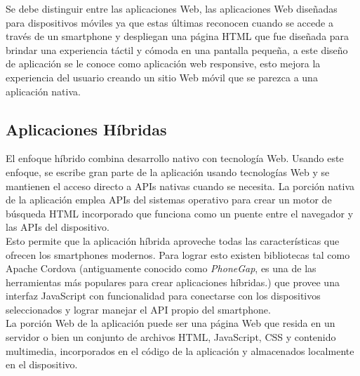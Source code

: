   Se debe distinguir entre las aplicaciones Web, las aplicaciones Web diseñadas para dispositivos móviles ya que estas últimas reconocen cuando se accede a través de un smartphone y despliegan una página HTML que fue diseñada para brindar una experiencia táctil y cómoda en una pantalla pequeña, a este diseño de aplicación se le conoce como aplicación web responsive, esto mejora la experiencia del usuario creando un sitio Web móvil que se parezca a una aplicación nativa.\\


  \subsection{Aplicaciones Híbridas}
  \label{sec:aplicaciones_hibridas}

    El enfoque híbrido combina desarrollo nativo con tecnología Web. Usando este enfoque, se escribe gran parte de la aplicación usando tecnologías Web y se mantienen el acceso directo a APIs nativas cuando se necesita. La porción nativa de la aplicación emplea APIs del sistemas operativo para crear un motor de búsqueda HTML incorporado que funciona como un puente entre el navegador y las APIs del dispositivo\cite{IBM_Mobile}.\\

    Esto permite que la aplicación híbrida aproveche todas las características que ofrecen los smartphones modernos. Para lograr esto existen bibliotecas tal como Apache Cordova (antiguamente conocido como \emph{PhoneGap}, es una de las herramientas más populares para crear aplicaciones híbridas.) que provee una interfaz JavaScript con funcionalidad para conectarse con los dispositivos seleccionados y lograr manejar el API propio del smartphone.\\

    La porción Web de la aplicación puede ser una página Web que resida en un servidor o bien un conjunto de archivos HTML, JavaScript, CSS y contenido multimedia, incorporados en el código de la aplicación y almacenados localmente en el dispositivo\cite{IBM_Mobile}.\\



